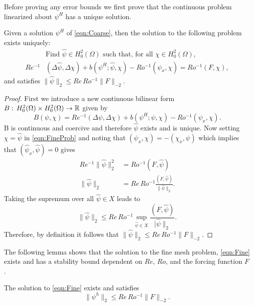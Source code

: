 Before proving any error bounds we first prove that the continuous problem
linearized about $\psi^H$ has a unique solution.
\begin{lemma}\label{lma:Fine}
  Given a solution $\psi^H$ of \eqref{eqn:Coarse}, then the solution to the
  following problem exists uniquely:
    \begin{equation}
      \begin{split}
        &\text{Find } \hat{\psi} \in H^2_0(\Omega) \text{ such that, for all }
          \chi\in H^2_0(\Omega), \\
        Re^{-1}&(\Delta \hat{\psi}, \Delta \chi)
          + b(\psi^H; \hat{\psi}, \chi)
          - Ro^{-1} (\hat{\psi}_x,\chi)
          = Ro^{-1} (F,\chi),
      \end{split}
      \label{eqn:FineProb}
    \end{equation}
    and satisfies $\|\hat{\psi}\|_2 \le Re\, Ro^{-1} \|F\|_{-2}$.
\end{lemma}
\begin{proof}
  First we introduce a new continuous bilinear form $B:\, H^2_0(\Omega) \times
  H^2_0(\Omega) \to \mathbb{R}$ given by
  \begin{equation*}
    B(\psi,\chi) = Re^{-1} (\Delta \psi, \Delta \chi)
      + b(\psi^H;\psi,\chi)
      - Ro^{-1} (\psi_x,\chi).
  \end{equation*}
  B is continuous and coercive and therefore $\hat{\psi}$ exists and is unique.
  Now setting $\chi=\hat{\psi}$ in \eqref{eqn:FineProb} and noting that
  $(\psi_x,\chi) = -(\chi_x,\psi)$ which implies that
  $(\hat{\psi}_x,\hat{\psi}) = 0$ gives
  \begin{align*}
    Re^{-1} \|\hat{\psi}\|_2^2 &= Ro^{-1} (F,\hat{\psi}) \\
    \|\hat{\psi}\|_2 &= Re\, Ro^{-1} \frac{(F,\hat{\psi})}{\|\hat{\psi}\|_2}.
  \end{align*}
  Taking the supremum over all $\hat{\psi}\in X$ leads to
  \begin{equation*}
    \|\hat{\psi}\|_{2} \le Re\, Ro^{-1} \sup_{\hat{\psi}\in X} \frac{(F,
      \hat{\psi})}{|\hat{\psi}\|_2}.
  \end{equation*}
  Therefore, by definition it follows that $\|\hat{\psi}\|_2 \le Re\, Ro^{-1} \|F\|_{-2}$.
\end{proof}
The following lemma shows that the solution to the fine mesh problem,
\eqref{eqn:Fine} exists and has a stability bound dependent on $Re,\, Ro$, and
the forcing function $F$.
\begin{lemma} \label{lma:Fineh}
  The solution to \eqref{eqn:Fine} exists and satisfies
  \begin{equation*}
    \|\psi^h\|_2 \le Re\, Ro^{-1} \|F\|_{-2}.
  \end{equation*}
\end{lemma}
